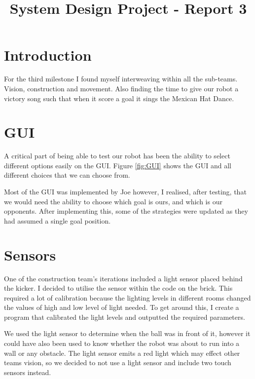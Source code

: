 \documentclass[conference,12pt]{IEEEtran}
\begin{document}
	
\title{\vspace{-0.05\textheight}System Design Project - Report 3}

\author{\vspace{-0.05\textheight}
}
	
\maketitle

\IEEEpeerreviewmaketitle

\section{Introduction}
For the third milestone I found myself interweaving within all the sub-teams. Vision, construction and movement. Also finding the time to give our robot a victory song such that when it score a goal it sings the Mexican Hat Dance.
	
\section{GUI}
A critical part of being able to test our robot has been the ability to select different options easily on the GUI. Figure \ref{fig:GUI} shows the GUI and all different choices that we can choose from. 

Most of the GUI was implemented by Joe however, I realised, after testing, that we would need the ability to choose which goal is ours, and which is our opponents. After implementing this, some of the strategies were updated as they had assumed a single goal position.

\section{Sensors}
One of the construction team's iterations included a light sensor placed behind the kicker. I decided to utilise the sensor within the code on the brick. This required a lot of calibration because the lighting levels in different rooms changed the values of high and low level of light needed. To get around this, I create a program that calibrated the light levels and outputted the required parameters.

We used the light sensor to determine when the ball was in front of it, however it could have also been used to know whether the robot was about to run into a wall or any obstacle. The light sensor emits a red light which may effect other teams vision, so we decided to not use a light sensor and include two touch sensors instead.
\end{document}
